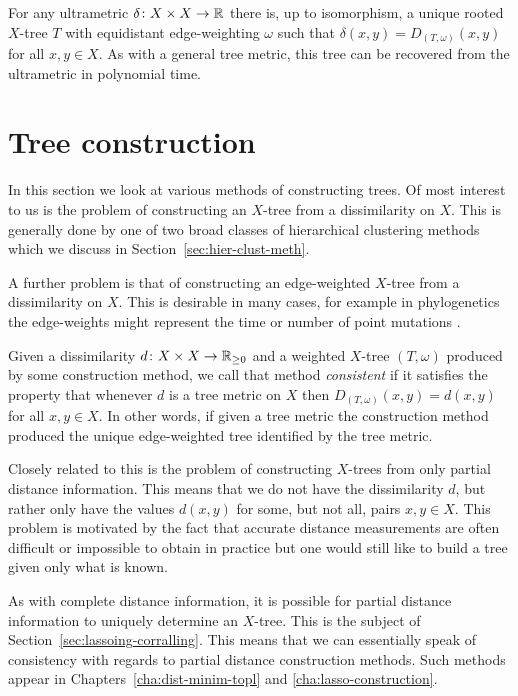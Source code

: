 For any ultrametric $\delta \colon X \times X \to {\mathbb R}$ there is, up to
isomorphism, a unique rooted $X$-tree $T$ with equidistant edge-weighting
$\omega$ such that $\delta(x,y) = D_{(T,\omega)}(x,y)$ for all $x,y \in X$.
As with a general tree metric, this tree can be recovered from the ultrametric
in polynomial time.

\section{Tree construction}
\label{sec:tree-construction}

In this section we look at various methods of constructing trees.  Of most
interest to us is the problem of constructing an $X$-tree from a dissimilarity
on $X$.  This is generally done by one of two broad classes of hierarchical
clustering methods which we discuss in Section~\ref{sec:hier-clust-meth}.

A further problem is that of constructing an edge-weighted $X$-tree from a
dissimilarity on $X$.  This is desirable in many cases, for example in
phylogenetics the edge-weights might represent the time or number of point
mutations \cite{felsenstein2004inferring}.

Given a dissimilarity $d \colon X \times X \to {\mathbb R}_{\geq 0}$ and a weighted
$X$-tree $(T,\omega)$ produced by some construction method, we call that
method \textit{consistent} if it satisfies the property that whenever $d$ is a
tree metric on $X$ then $D_{(T,\omega)}(x,y) = d(x,y)$ for all $x,y \in X$.
In other words, if given a tree metric the construction method produced the
unique edge-weighted tree identified by the tree metric.

Closely related to this is the problem of constructing $X$-trees from only
partial distance information.  This means that we do not have the
dissimilarity $d$, but rather only have the values $d(x,y)$ for some, but not
all, pairs $x,y \in X$.  This problem is motivated by the fact that accurate
distance measurements are often difficult or impossible to obtain in practice
but one would still like to build a tree given only what is known.

As with complete distance information, it is possible for partial distance
information to uniquely determine an $X$-tree.  This is the subject of
Section~\ref{sec:lassoing-corralling}.  This means that we can essentially
speak of consistency with regards to partial distance construction methods.
Such methods appear in Chapters~\ref{cha:dist-minim-topl} and
\ref{cha:lasso-construction}.

